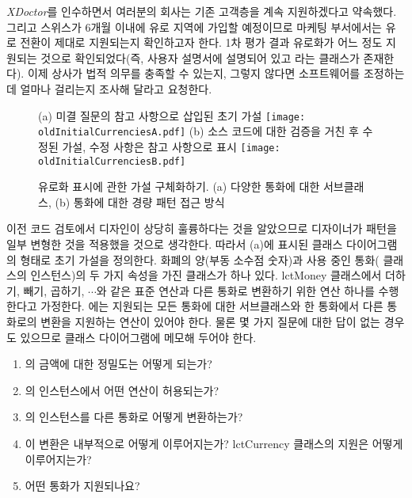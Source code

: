 \documentclass[a4paper,10pt,twoside]{book}
\begin{document}
\emph{XDoctor}를 인수하면서 여러분의 회사는 기존 고객층을 계속 지원하겠다고 약속했다. 그리고 스위스가 6개월 이내에 유로 지역에 가입할 예정이므로 마케팅 부서에서는 유로 전환이 제대로 지원되는지 확인하고자 한다. 1차 평가 결과 유로화가 어느 정도 지원되는 것으로 확인되었다(즉, 사용자 설명서에 설명되어 있고 라는 클래스가 존재한다). 이제 상사가 법적 의무를 충족할 수 있는지, 그렇지 않다면 소프트웨어를 조정하는 데 얼마나 걸리는지 조사해 달라고 요청한다.

\begin{figure}
\begin{center}
{\small (a) 미결 질문의 참고 사항으로 삽입된 초기 가설}
\texttt{[image: oldInitialCurrenciesA.pdf]}
{\small (b) 소스 코드에 대한 검증을 거친 후 수정된 가설, 수정 사항은 참고 사항으로 표시}
\texttt{[image: oldInitialCurrenciesB.pdf]}
\caption{유로화 표시에 관한 가설 구체화하기. (a) 다양한 통화에 대한 서브클래스, (b) 통화에 대한 경량 패턴 접근 방식}
\end{center}
\end{figure}

이전 코드 검토에서 디자인이 상당히 훌륭하다는 것을 알았으므로 디자이너가  패턴을 일부 변형한 것을 적용했을 것으로 생각한다. 따라서  (a)에 표시된 클래스 다이어그램의 형태로 초기 가설을 정의한다. 화폐의 양(부동 소수점 숫자)과 사용 중인 통화( 클래스의 인스턴스)의 두 가지 속성을 가진  클래스가 하나 있다. lct{Money} 클래스에서 더하기, 빼기, 곱하기, $\cdots$와 같은 표준 연산과 다른 통화로 변환하기 위한 연산 하나를 수행한다고 가정한다. 에는 지원되는 모든 통화에 대한 서브클래스와 한 통화에서 다른 통화로의 변환을 지원하는 연산이 있어야 한다. 물론 몇 가지 질문에 대한 답이 없는 경우도 있으므로 클래스 다이어그램에 메모해 두어야 한다.

\begin{enumerate}
  \item {}의 금액에 대한 정밀도는 어떻게 되는가?

  \item {}의 인스턴스에서 어떤 연산이 허용되는가?

  \item {}의 인스턴스를 다른 통화로 어떻게 변환하는가?

  \item 이 변환은 내부적으로 어떻게 이루어지는가? lct{Currency} 클래스의 지원은 어떻게 이루어지는가?

  \item 어떤 통화가 지원되나요?

\end{enumerate}
\end{document}
